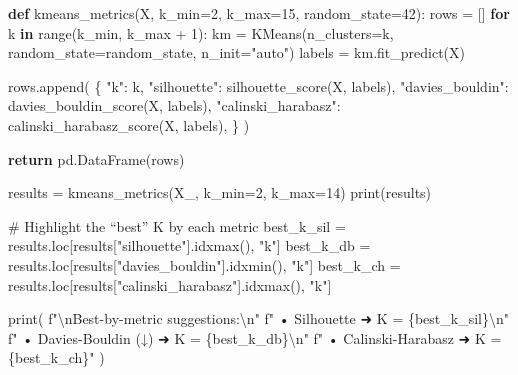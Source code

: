 \documentclass[
  letterpaper,
  DIV=11,
  numbers=noendperiod]{scrreprt}
\newenvironment{Shaded}{\begin{snugshade}}{\end{snugshade}}
\newcommand{\BuiltInTok}[1]{\textcolor[rgb]{0.00,0.23,0.31}{#1}}
\newcommand{\CharTok}[1]{\textcolor[rgb]{0.13,0.47,0.30}{#1}}
\newcommand{\CommentTok}[1]{\textcolor[rgb]{0.37,0.37,0.37}{#1}}
\newcommand{\ControlFlowTok}[1]{\textcolor[rgb]{0.00,0.23,0.31}{\textbf{#1}}}
\newcommand{\DecValTok}[1]{\textcolor[rgb]{0.68,0.00,0.00}{#1}}
\newcommand{\KeywordTok}[1]{\textcolor[rgb]{0.00,0.23,0.31}{\textbf{#1}}}
\newcommand{\NormalTok}[1]{\textcolor[rgb]{0.00,0.23,0.31}{#1}}
\newcommand{\OperatorTok}[1]{\textcolor[rgb]{0.37,0.37,0.37}{#1}}
\newcommand{\SpecialCharTok}[1]{\textcolor[rgb]{0.37,0.37,0.37}{#1}}
\newcommand{\SpecialStringTok}[1]{\textcolor[rgb]{0.13,0.47,0.30}{#1}}
\newcommand{\StringTok}[1]{\textcolor[rgb]{0.13,0.47,0.30}{#1}}
\begin{document}
\begin{Shaded}
\begin{Highlighting}[]
\KeywordTok{def}\NormalTok{ kmeans\_metrics(X, k\_min}\OperatorTok{=}\DecValTok{2}\NormalTok{, k\_max}\OperatorTok{=}\DecValTok{15}\NormalTok{, random\_state}\OperatorTok{=}\DecValTok{42}\NormalTok{):}
\NormalTok{    rows }\OperatorTok{=}\NormalTok{ []}
    \ControlFlowTok{for}\NormalTok{ k }\KeywordTok{in} \BuiltInTok{range}\NormalTok{(k\_min, k\_max }\OperatorTok{+} \DecValTok{1}\NormalTok{):}
\NormalTok{        km }\OperatorTok{=}\NormalTok{ KMeans(n\_clusters}\OperatorTok{=}\NormalTok{k, random\_state}\OperatorTok{=}\NormalTok{random\_state, n\_init}\OperatorTok{=}\StringTok{"auto"}\NormalTok{)}
\NormalTok{        labels }\OperatorTok{=}\NormalTok{ km.fit\_predict(X)}

\NormalTok{        rows.append(}
\NormalTok{            \{}
                \StringTok{"k"}\NormalTok{: k,}
                \StringTok{"silhouette"}\NormalTok{: silhouette\_score(X, labels),}
                \StringTok{"davies\_bouldin"}\NormalTok{: davies\_bouldin\_score(X, labels),}
                \StringTok{"calinski\_harabasz"}\NormalTok{: calinski\_harabasz\_score(X, labels),}
\NormalTok{            \}}
\NormalTok{        )}

    \ControlFlowTok{return}\NormalTok{ pd.DataFrame(rows)}


\NormalTok{results }\OperatorTok{=}\NormalTok{ kmeans\_metrics(X\_, k\_min}\OperatorTok{=}\DecValTok{2}\NormalTok{, k\_max}\OperatorTok{=}\DecValTok{14}\NormalTok{)}
\BuiltInTok{print}\NormalTok{(results)}

\CommentTok{\# Highlight the “best” K by each metric}
\NormalTok{best\_k\_sil }\OperatorTok{=}\NormalTok{ results.loc[results[}\StringTok{"silhouette"}\NormalTok{].idxmax(), }\StringTok{"k"}\NormalTok{]}
\NormalTok{best\_k\_db  }\OperatorTok{=}\NormalTok{ results.loc[results[}\StringTok{"davies\_bouldin"}\NormalTok{].idxmin(), }\StringTok{"k"}\NormalTok{]}
\NormalTok{best\_k\_ch  }\OperatorTok{=}\NormalTok{ results.loc[results[}\StringTok{"calinski\_harabasz"}\NormalTok{].idxmax(), }\StringTok{"k"}\NormalTok{]}

\BuiltInTok{print}\NormalTok{(}
    \SpecialStringTok{f"}\CharTok{\textbackslash{}n}\SpecialStringTok{Best{-}by{-}metric suggestions:}\CharTok{\textbackslash{}n}\SpecialStringTok{"}
    \SpecialStringTok{f"  • Silhouette         ➜ K = }\SpecialCharTok{\{}\NormalTok{best\_k\_sil}\SpecialCharTok{\}}\CharTok{\textbackslash{}n}\SpecialStringTok{"}
    \SpecialStringTok{f"  • Davies{-}Bouldin (↓) ➜ K = }\SpecialCharTok{\{}\NormalTok{best\_k\_db}\SpecialCharTok{\}}\CharTok{\textbackslash{}n}\SpecialStringTok{"}
    \SpecialStringTok{f"  • Calinski{-}Harabasz  ➜ K = }\SpecialCharTok{\{}\NormalTok{best\_k\_ch}\SpecialCharTok{\}}\SpecialStringTok{"}
\NormalTok{)}
\end{Highlighting}
\end{Shaded}
\end{document}
